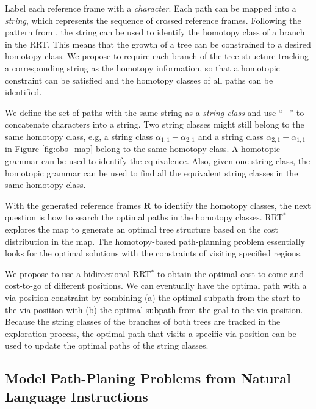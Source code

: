 \documentclass[phd]{byuprop}
\begin{document}
Label each reference frame with a \emph{character}.
Each path can be mapped into a {\em string}, which represents the sequence of crossed reference frames.
Following the pattern from \cite{Hernandez2015}, the string can be used to identify the homotopy class of a branch in the RRT.
This means that the growth of a tree can be constrained to a desired homotopy class.
We propose to require each branch of the tree structure tracking a corresponding string as the homotopy information, so that a homotopic constraint can be satisfied and the homotopy classes of all paths can be identified.

We define the set of paths with the same string as a \emph{string class} and use ``$ - $'' to concatenate characters into a string.
Two string classes might still belong to the same homotopy class, e.g, a string class $ \alpha_{1,1}-\alpha_{2,1} $ and a string class $ \alpha_{2,1}-\alpha_{1,1} $ in Figure \ref{fig:obs_map} belong to the same homotopy class.
A homotopic grammar can be used to identify the equivalence.
Also, given one string class, the homotopic grammar can be used to find all the equivalent string classes in the same homotopy class.

With the generated reference frames $ \mathbf{R} $ to identify the homotopy classes, the next question is how to search the optimal paths in the homotopy classes.
RRT$^{*}$ explores the map to generate an optimal tree structure based on the cost distribution in the map.
The homotopy-based path-planning problem essentially looks for the optimal solutions with the constraints of visiting specified regions.

We propose to use a bidirectional RRT$^{*}$ to obtain the optimal cost-to-come and cost-to-go of different positions.
We can eventually have the optimal path with a via-position constraint by combining (a) the optimal subpath from the start to the via-position with (b) the optimal subpath from the goal to the via-position.
Because the string classes of the branches of both trees are tracked in the exploration process, the optimal path that visits a specific via position can be used to update the optimal paths of the string classes. 

\subsection{Model Path-Planing Problems from Natural Language Instructions}
\label{sec:project_description:path_planning_with_natural_language_instruction}
\end{document}
